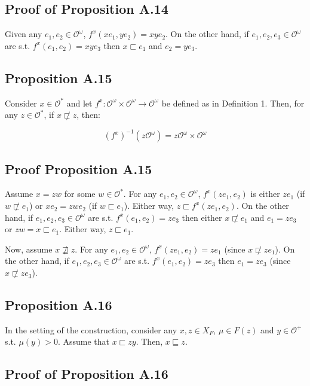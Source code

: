 \documentclass[a4paper]{article}
\newcommand{\Obs}{\mathcal{O}}
\newcommand{\ObsO}{\Obs^\omega}
\begin{document}
\subsection{Proof of Proposition A.14}

Given any ${e_1,e_2 \in \ObsO}$, ${f^x(xe_1,ye_2)=xye_2}$. On the other hand, if ${e_1,e_2,e_3 \in \ObsO}$ are s.t. ${f^x(e_1,e_2)=xye_3}$ then ${x \sqsubset e_1}$ and ${e_2=ye_3}$.

\subsection{Proposition A.15}

Consider ${x \in \Obs^*}$ and let ${f^x: \ObsO \times \ObsO \rightarrow \ObsO}$ be defined as in Definition 1. Then, for any ${z \in \Obs^*}$, if ${x \not\sqsubset z}$, then:

$${(f^x)^{-1}(z\ObsO) = z\ObsO \times \ObsO}$$

\subsection{Proof Proposition A.15}

Assume ${x = zw}$ for some ${w \in \Obs^*}$. For any ${e_1,e_2 \in \ObsO}$, ${f^x(ze_1,e_2)}$ is either ${ze_1}$ (if $w \not\sqsubset e_1$) or ${xe_2=zwe_2}$ (if ${w \sqsubset e_1}$). Either way, ${z \sqsubset f^x(ze_1,e_2)}$. On the other hand, if ${e_1,e_2,e_3 \in \ObsO}$ are s.t. ${f^x(e_1,e_2)=ze_3}$ then either ${x \not\sqsubset e_1}$ and ${e_1 = ze_3}$ or ${zw = x \sqsubset e_1}$. Either way, ${z \sqsubset e_1}$.

Now, assume ${x \not\sqsupseteq z}$. For any ${e_1,e_2 \in \ObsO}$, ${f^x(ze_1,e_2)=ze_1}$ (since ${x \not\sqsubset ze_1}$). On the other hand, if ${e_1,e_2,e_3 \in \ObsO}$ are s.t. ${f^x(e_1,e_2)=ze_3}$ then ${e_1 = ze_3}$ (since ${x \not\sqsubset ze_3}$).

\subsection{Proposition A.16}

In the setting of the construction, consider any ${x,z \in X_F}$, ${\mu \in F(z)}$ and ${y \in \Obs^+}$ s.t. ${\mu(y) > 0}$. Assume that ${x \sqsubset zy}$. Then, ${x \sqsubseteq z}$.

\subsection{Proof of Proposition A.16}
\end{document}
